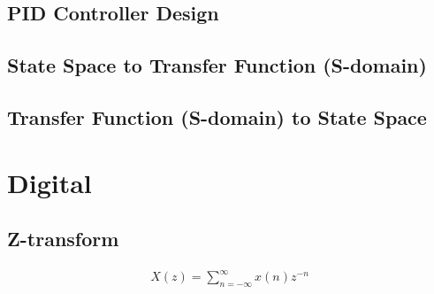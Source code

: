 \documentclass{article}
\newcommand{\sincludepdf}[2][]{
	
}
\begin{document}
\subsection{PID Controller Design}

\sincludepdf[pages={5},
			pagecommand=\subsubsection*{Example 1}
		]{scan/11221301.pdf}


\subsection{State Space to Transfer Function (S-domain)}

\sincludepdf[pages={2-3}]{scan/11211301.pdf}

\subsection{Transfer Function (S-domain) to State Space}

\sincludepdf[pages={4},
			pagecommand=\subsubsection*{Example 1}
		]{scan/11211301.pdf}
\sincludepdf[pages={5}]{scan/11211301.pdf}

\section{Digital}

\subsection{Z-transform}

\begin{align}
	X(z) = \sum_{n = -\infty}^{\infty} x(n) z^{-n}
\end{align}

\sincludepdf[pages={6},
		pagecommand=\subsubsection*{Example 1}
	]{scan/11211301.pdf}

\sincludepdf[pages={7},
		pagecommand=\subsection{Geometric Series}
	]{scan/11211301.pdf}
\end{document}
